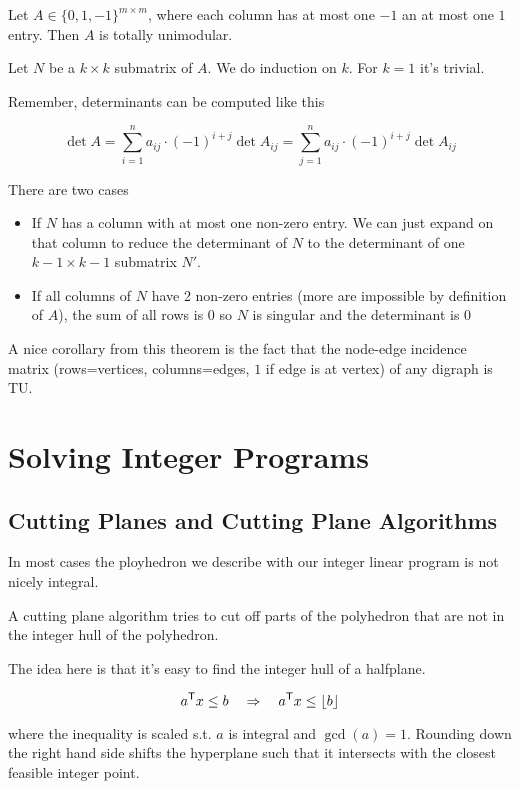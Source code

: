 \begin{thm} Let $A\in \{0,1,-1\}^{m\times m}$, where each column has at most one $-1$ an at most one $1$ entry. Then $A$ is totally unimodular.
\end{thm}

\begin{pr} Let $N$ be a $k\times k$ submatrix of $A$. We do induction on $k$. For $k=1$ it's trivial.

Remember, determinants can be computed like this

\[\det A = \sum_{i=1}^n a_{ij} \cdot (-1)^{i+j} \det A_{ij} = \sum_{j=1}^n a_{ij} \cdot (-1)^{i+j} \det A_{ij}\]

There are two cases

\begin{itemize}
\item If $N$ has a column with at most one non-zero entry. We can just expand on that column to reduce the determinant of $N$ to the determinant of one $k-1\times k-1$ submatrix $N'$.

\item If all columns of $N$ have 2 non-zero entries (more are impossible by definition of $A$), the sum of all rows is $0$ so $N$ is singular and the determinant is $0$
\end{itemize}
\end{pr}

A nice corollary from this theorem is the fact that the node-edge incidence matrix (rows=vertices, columns=edges, $1$ if edge is at vertex) of any digraph is TU.

\chapter{Solving Integer Programs}
\section{Cutting Planes and Cutting Plane Algorithms}
In most cases the ployhedron we describe with our integer linear program is not nicely integral.

A cutting plane algorithm tries to cut off parts of the polyhedron that are not in the integer hull of the polyhedron.

The idea here is that it's easy to find the integer hull of a halfplane. 

\[{a}^\text{\upshape \sffamily T} x \leq b \quad \Rightarrow \quad {a}^\text{\upshape \sffamily T} x \leq \lfloor b \rfloor\]

where the inequality is scaled s.t. $a$ is integral and $\gcd(a)=1$. Rounding down the right hand side shifts the hyperplane such that it intersects with the closest feasible integer point.

